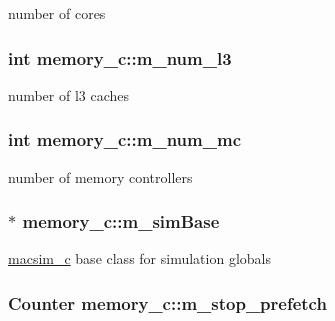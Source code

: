 \label{classmemory__c_afaf8b643ce736f9ea9b2050b6740e710}
number of cores \hypertarget{classmemory__c_a3cf6fe78e2b25f56b3ff51b6f8b383d7}{
\subsubsection[{m\_\-num\_\-l3}]{\setlength{\rightskip}{0pt plus 5cm}int {\bf memory\_\-c::m\_\-num\_\-l3}}}
\label{classmemory__c_a3cf6fe78e2b25f56b3ff51b6f8b383d7}
number of l3 caches \hypertarget{classmemory__c_ade8ecba4b6abbf18ea424e530d0962e9}{
\subsubsection[{m\_\-num\_\-mc}]{\setlength{\rightskip}{0pt plus 5cm}int {\bf memory\_\-c::m\_\-num\_\-mc}}}
\label{classmemory__c_ade8ecba4b6abbf18ea424e530d0962e9}
number of memory controllers \hypertarget{classmemory__c_a8ba3319a3e385a0984dcb0ff7531a397}{
\subsubsection[{m\_\-simBase}]{$\ast$ {\bf memory\_\-c::m\_\-simBase}}}
\label{classmemory__c_a8ba3319a3e385a0984dcb0ff7531a397}
\hyperlink{classmacsim__c}{macsim\_\-c} base class for simulation globals \hypertarget{classmemory__c_ac90f740154b2099375a4464a264c3dc0}{
\subsubsection[{m\_\-stop\_\-prefetch}]{\setlength{\rightskip}{0pt plus 5cm}Counter {\bf memory\_\-c::m\_\-stop\_\-prefetch}}}

